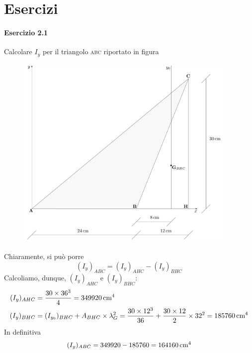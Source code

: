 \section{Esercizi}
\paragraph{Esercizio 2.1}
Calcolare $I_y$ per il triangolo \textsc{abc} riportato in figura
\renewcommand{\thefigure}{2.1~-~1}
\begin{figure}[ht]
\centering
\includegraphics[width=0.95\textwidth]{Immagini/Parte_2/Esercizio2_1/Esercizio2_1_1.pdf}
\caption{}
\label{Esercizio2_1}
\end{figure}

\noindent Chiaramente, si può porre 
\begin{equation*}
(I_{y})_{ABC} = (I_{y})_{AHC}-(I_{y})_{BHC}
\end{equation*}
Calcoliamo, dunque, $(I_{y})_{AHC}$ e $(I_{y})_{BHC}$:
\begin{align*}
(I_{y})_{AHC} &= \frac{30\times 36^3}{4} = 349920\,\textup{cm}^4 \\
(I_{y})_{BHC} &= (I_{y_0})_{BHC}+A_{BHC}\times \lambda_{G}^{2} = \frac{30\times 12^3}{36}+\frac{30\times 12}{2}\times 32^2 = 185760\,\textup{cm}^4
\end{align*}
In definitiva
\begin{equation*}
(I_{y})_{ABC} = 349920-185760 = 164160\,\textup{cm}^4
\end{equation*}
\clearpage
